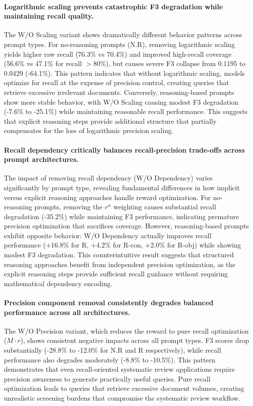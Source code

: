 \paragraph{Logarithmic scaling prevents catastrophic F3 degradation while maintaining recall quality.} The W/O Scaling variant shows dramatically different behavior patterns across prompt types. For no-reasoning prompts (N.R), removing logarithmic scaling yields higher raw recall (76.3\% vs 70.4\%) and improved high-recall coverage (56.6\% vs 47.1\% for recall $>80\%$), but causes severe F3 collapse from 0.1195 to 0.0429 (-64.1\%). This pattern indicates that without logarithmic scaling, models optimize for recall at the expense of precision control, creating queries that retrieve excessive irrelevant documents. Conversely, reasoning-based prompts show more stable behavior, with W/O Scaling causing modest F3 degradation (-7.6\% to -25.1\%) while maintaining reasonable recall performance. This suggests that explicit reasoning steps provide additional structure that partially compensates for the loss of logarithmic precision scaling.

\paragraph{Recall dependency critically balances recall-precision trade-offs across prompt architectures.} The impact of removing recall dependency (W/O Dependency) varies significantly by prompt type, revealing fundamental differences in how implicit versus explicit reasoning approaches handle reward optimization. For no-reasoning prompts, removing the $r^\alpha$ weighting causes substantial recall degradation (-35.2\%) while maintaining F3 performance, indicating premature precision optimization that sacrifices coverage. However, reasoning-based prompts exhibit opposite behavior: W/O Dependency actually improves recall performance (+16.8\% for R, +4.2\% for R-con, +2.0\% for R-obj) while showing modest F3 degradation. This counterintuitive result suggests that structured reasoning approaches benefit from independent precision optimization, as the explicit reasoning steps provide sufficient recall guidance without requiring mathematical dependency encoding.

\paragraph{Precision component removal consistently degrades balanced performance across all architectures.} The W/O Precision variant, which reduces the reward to pure recall optimization ($M \cdot r$), shows consistent negative impacts across all prompt types. F3 scores drop substantially (-28.8\% to -12.0\% for N.R and R respectively), while recall performance also degrades moderately (-8.8\% to -10.5\%). This pattern demonstrates that even recall-oriented systematic review applications require precision awareness to generate practically useful queries. Pure recall optimization leads to queries that retrieve excessive document volumes, creating unrealistic screening burdens that compromise the systematic review workflow.

